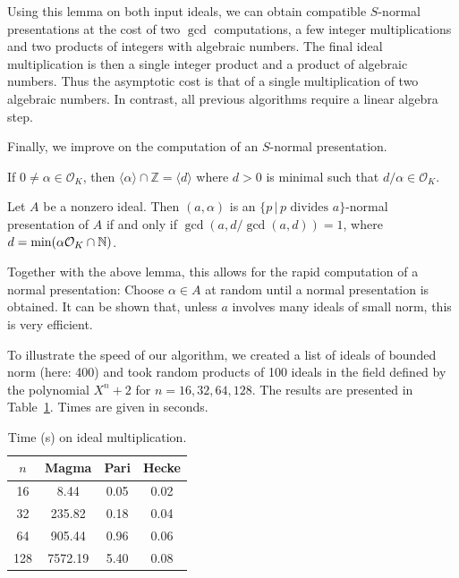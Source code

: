 \documentclass{sig-alternate-05-2015}
\begin{document}
Using this lemma on both input ideals, we can obtain compatible $S$-normal 
presentations at the cost of two $\gcd$ computations, a few integer multiplications and two products of integers with algebraic numbers. The final ideal
multiplication is then a single integer product and a product of
algebraic numbers. Thus the asymptotic cost is that of a single multiplication of two algebraic numbers.
In contrast, all previous algorithms require a linear algebra step.

Finally, we improve on the computation of an $S$-normal presentation.

\begin{lemma}
If $0\ne\alpha\in \mathcal O_K$, then $\langle\alpha\rangle\cap \mathbb Z = \langle d\rangle$ where $d>0$ is minimal such that $d/\alpha\in \mathcal O_K$.
\end{lemma}

\begin{theorem}
Let $A$ be a nonzero ideal. Then
$(a, \alpha)$ is an $\{p \, | \, p \text{ divides }a\}$-normal presentation of $A$ if and only if
$\gcd(a, {d}/{\gcd(a, d)}) = 1$, where $d = \min(\alpha\mathcal O_K \cap \mathbb{N})$.
\end{theorem}

Together with the above lemma, this allows for the rapid computation of a
normal presentation: Choose $\alpha\in A$ at random until a normal presentation
is obtained. It can be shown that, unless $a$ involves many ideals of small
norm, this is very efficient.

To illustrate the speed of our algorithm, we created a list of ideals of bounded norm (here: 400) and
took random products of 100 ideals in the field
defined by the polynomial $X^n + 2$ for $n=16, 32, 64, 128$.
The results are presented in Table~\ref{tab:ideals}.
Times are given in seconds.

\begin{table}
\center
\caption{Time (s) on ideal multiplication.}
\begin{small}
\setlength{\tabcolsep}{2.0pt}
\renewcommand{\arraystretch}{1.08}
\begin{tabular}{c c c c} \hline
$n$ & Magma & Pari & Hecke  \\ \hline
     16  &  8.44 & 0.05 & 0.02   \\
     32  &   235.82  &   0.18   &     0.04 \\
     64  &   905.44  &     0.96   &     0.06    \\
    128  &   7572.19   &     5.40    &       0.08 
\end{tabular}
\label{tab:ideals}
\end{small}
\end{table}
\end{document}
